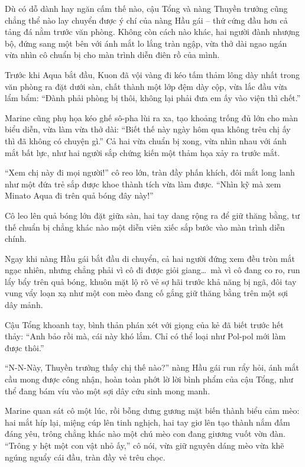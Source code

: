\documentclass[../main.tex]{subfiles}
\begin{document}
Dù có dỗ dành hay ngăn cấm thế nào, cậu Tổng và nàng Thuyền trưởng cũng chẳng thể nào lay chuyển được ý chí của nàng Hầu gái – thứ cứng đầu hơn cả tảng đá nằm trước văn phòng. Không còn cách nào khác, hai người đành nhượng bộ, đứng sang một bên với ánh mắt lo lắng tràn ngập, vừa thở dài ngao ngán vừa nhìn cô chuẩn bị cho màn trình diễn điên rồ của mình.

Trước khi Aqua bắt đầu, Kuon đã vội vàng đi kéo tấm thảm lông dày nhất trong văn phòng ra đặt dưới sàn, chất thành một lớp đệm dày cộp, vừa lắc đầu vừa lẩm bẩm: ``Đành phải phòng bị thôi, không lại phải đưa em ấy vào viện thì chết.''

Marine cũng phụ họa kéo ghế sô-pha lùi ra xa, tạo khoảng trống đủ lớn cho màn biểu diễn, vừa làm vừa thở dài: ``Biết thế này ngày hôm qua không trêu chị ấy thì đã không có chuyện gì.'' Cả hai vừa chuẩn bị xong, vừa nhìn nhau với ánh mắt bất lực, như hai người sắp chứng kiến một thảm họa xảy ra trước mắt.

``Xem chị này đi mọi người!'' cô reo lớn, tràn đầy phấn khích, đôi mắt long lanh như một đứa trẻ sắp được khoe thành tích vừa làm được. ``Nhìn kỹ mà xem Minato Aqua đi trên quả bóng đây này!''

Cô leo lên quả bóng lớn đặt giữa sàn, hai tay dang rộng ra để giữ thăng bằng, tư thế chuẩn bị chẳng khác nào một diễn viên xiếc sắp bước vào màn trình diễn chính.

Ngay khi nàng Hầu gái bắt đầu di chuyển, cả hai người đứng xem đều tròn mắt ngạc nhiên, nhưng chẳng phải vì cô đi được giỏi giang\dots\ mà vì cô đang co ro, run lẩy bẩy trên quả bóng, khuôn mặt lộ rõ vẻ sợ hãi trước khả năng bị ngã, đôi tay vung vẩy loạn xạ như một con mèo đang cố gắng giữ thăng bằng trên một sợi dây mảnh.


Cậu Tổng khoanh tay, bình thản phán xét với giọng của kẻ đã biết trước hết thảy: ``Anh bảo rồi mà, cái này khó lắm. Chỉ có thể loại như Pol-pol mới làm được thôi.''

``N-N-Này, Thuyền trưởng thấy chị thế nào?'' nàng Hầu gái run rẩy hỏi, ánh mắt cầu mong được công nhận, hoàn toàn phớt lờ lời bình phẩm của cậu Tổng, như thể đang bám víu vào một sợi dây cứu sinh mong manh.

Marine quan sát cô một lúc, rồi bỗng dưng gương mặt biến thành biểu cảm mèo: hai mắt híp lại, miệng cúp lên tinh nghịch, hai tay giơ lên tạo thành nắm đấm đáng yêu, trông chẳng khác nào một chú mèo con đang giương vuốt vờn đàn. ``Trông y hệt một con vật nhỏ ấy,'' cô nói, vừa giữ nguyên dáng mèo vừa khẽ ngúng nguẩy cái đầu, tràn đầy vẻ trêu chọc.
\end{document}
